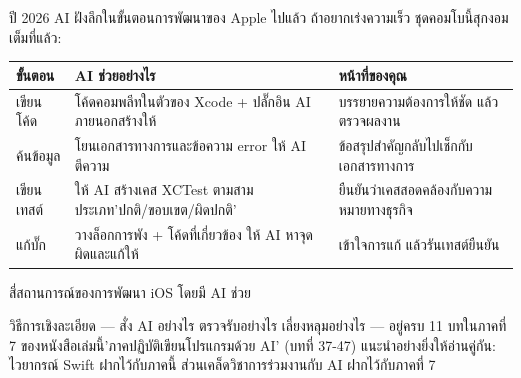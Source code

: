 
ปี 2026 AI ฝังลึกในขั้นตอนการพัฒนาของ Apple ไปแล้ว ถ้าอยากเร่งความเร็ว ชุดคอมโบนี้สุกงอมเต็มที่แล้ว:

\begin{center}
\begin{tabularx}{\linewidth}{|X|X|X|}
\hline
\textbf{ขั้นตอน} & \textbf{AI ช่วยอย่างไร} & \textbf{หน้าที่ของคุณ} \tabularnewline
\hline
เขียนโค้ด & โค้ดคอมพลีทในตัวของ Xcode + ปลั๊กอิน AI ภายนอกสร้างให้ & บรรยายความต้องการให้ชัด แล้วตรวจผลงาน \tabularnewline
ค้นข้อมูล & โยนเอกสารทางการและข้อความ error ให้ AI ตีความ & ข้อสรุปสำคัญกลับไปเช็กกับเอกสารทางการ \tabularnewline
เขียนเทสต์ & ให้ AI สร้างเคส XCTest ตามสามประเภท'ปกติ/ขอบเขต/ผิดปกติ' & ยืนยันว่าเคสสอดคล้องกับความหมายทางธุรกิจ \tabularnewline
แก้บั๊ก & วางล็อกการพัง + โค้ดที่เกี่ยวข้อง ให้ AI หาจุดผิดและแก้ให้ & เข้าใจการแก้ แล้วรันเทสต์ยืนยัน \tabularnewline
\hline
\end{tabularx}
\end{center}

\begin{center}\small\color{gray}สี่สถานการณ์ของการพัฒนา iOS โดยมี AI ช่วย\end{center}

วิธีการเชิงละเอียด — สั่ง AI อย่างไร ตรวจรับอย่างไร เลี่ยงหลุมอย่างไร — อยู่ครบ 11 บทในภาคที่ 7 ของหนังสือเล่มนี้'ภาคปฏิบัติเขียนโปรแกรมด้วย AI' (บทที่ 37-47) แนะนำอย่างยิ่งให้อ่านคู่กัน: ไวยากรณ์ Swift ฝากไว้กับภาคนี้ ส่วนเคล็ดวิชาการร่วมงานกับ AI ฝากไว้กับภาคที่ 7


